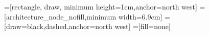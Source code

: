 \newcommand{\onethird}{2.3cm}

\usetikzlibrary{positioning,fit,matrix}
=[rectangle, draw, minimum height=1cm,anchor=north west]
=[architecture_node_nofill,minimum width=6.9cm]
=[draw=black,dashed,anchor=north west]
=[fill=none] %